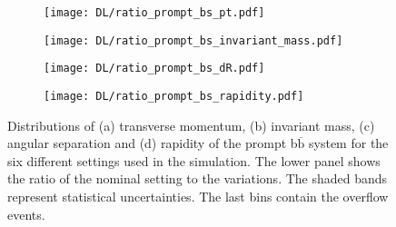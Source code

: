 \begin{figure}[H]
    \centering
    \begin{subfigure}{0.49\textwidth}
        \centering
        \texttt{[image: DL/ratio\_prompt\_bs\_pt.pdf]}
        \caption{}
        \label{app:subfig:pt(bbbar_prompt)_DL}
    \end{subfigure}
    \begin{subfigure}{0.49\textwidth}
        \centering
        \texttt{[image: DL/ratio\_prompt\_bs\_invariant\_mass.pdf]}
        \caption{}
        \label{app:subfig:m(bbbar_prompt)_DL}
    \end{subfigure}

    \vspace{0.2cm}
    
    \begin{subfigure}{0.49\textwidth}
        \centering
        \texttt{[image: DL/ratio\_prompt\_bs\_dR.pdf]}
        \caption{}
        \label{app:subfig:dR(bbbar_prompt)_DL}
    \end{subfigure}
    \begin{subfigure}{0.49\textwidth}
        \centering
        \texttt{[image: DL/ratio\_prompt\_bs\_rapidity.pdf]}
        \caption{}
        \label{app:subfig:y(bbbar_prompt)_DL}
    \end{subfigure}
    \caption{Distributions of (a) transverse momentum, (b) invariant mass,  (c) angular separation and (d) rapidity of the prompt b$\overline{\text{b}}$ system for the six different settings used in the simulation. The lower panel shows the ratio of the nominal setting to the variations. The shaded bands represent statistical uncertainties. The last bins contain the overflow events.}
    \label{app:fig:prompt_bbbar_DL}
\end{figure}


